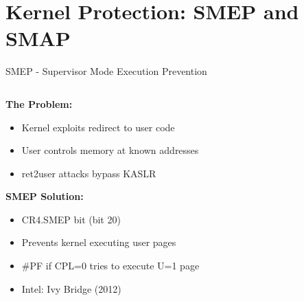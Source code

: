 \documentclass[aspectratio=169,12pt]{beamer}
\begin{document}
\section{Kernel Protection: SMEP and SMAP}

\begin{frame}{SMEP - Supervisor Mode Execution Prevention}
    \begin{columns}
        \begin{column}{0.5\textwidth}
            \textbf{The Problem:}
            \begin{itemize}
                \item Kernel exploits redirect to user code
                \item User controls memory at known addresses
                \item ret2user attacks bypass KASLR
            \end{itemize}
            
            \vspace{0.3cm}
            \textbf{SMEP Solution:}
            \begin{itemize}
                \item CR4.SMEP bit (bit 20)
                \item Prevents kernel executing user pages
                \item \#PF if CPL=0 tries to execute U=1 page
                \item Intel: Ivy Bridge (2012)
            \end{itemize}
        \end{column}
        \begin{column}{0.5\textwidth}
\end{column}
\end{columns}
\end{frame}
\end{document}
